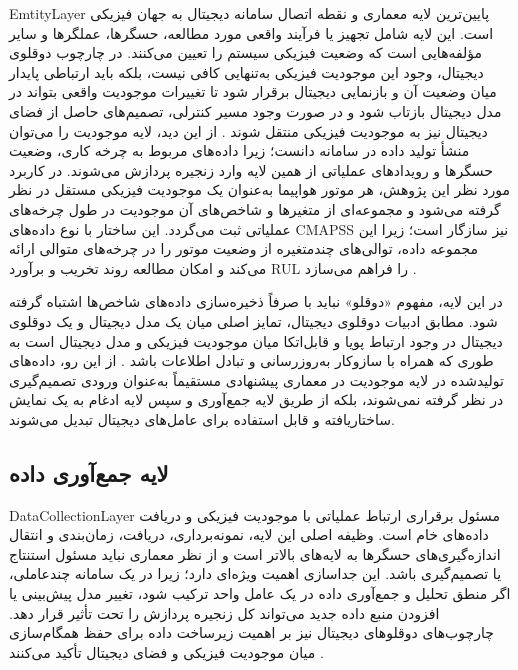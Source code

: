 \documentclass[a4paper,fleqn]{report}
\begin{document}
\gls{EmtityLayer} پایین‌ترین لایه معماری و نقطه اتصال سامانه دیجیتال به جهان فیزیکی است. این لایه شامل تجهیز یا فرآیند واقعی مورد مطالعه، حسگرها، عملگرها و سایر مؤلفه‌هایی است که وضعیت فیزیکی سیستم را تعیین می‌کنند. در چارچوب دوقلوی دیجیتال، وجود این موجودیت فیزیکی به‌تنهایی کافی نیست، بلکه باید ارتباطی پایدار میان وضعیت آن و بازنمایی دیجیتال برقرار شود تا تغییرات موجودیت واقعی بتواند در مدل دیجیتال بازتاب شود و در صورت وجود مسیر کنترلی، تصمیم‌های حاصل از فضای دیجیتال نیز به موجودیت فیزیکی منتقل شوند \cite{tao2019digital,barricelli2019survey,fuller2020digital}.
 از این دید، لایه موجودیت را می‌توان منشأ تولید داده در سامانه دانست؛ زیرا داده‌های مربوط به چرخه کاری، وضعیت حسگرها و رویدادهای عملیاتی از همین لایه وارد زنجیره پردازش می‌شوند. در کاربرد مورد نظر این پژوهش، هر موتور هواپیما به‌عنوان یک موجودیت فیزیکی مستقل در نظر گرفته می‌شود و مجموعه‌ای از متغیرها و شاخص‌های آن موجودیت در طول چرخه‌های عملیاتی ثبت می‌گردد. این ساختار با نوع داده‌های \gls{CMAPSS} نیز سازگار است؛ زیرا این مجموعه داده، توالی‌های چندمتغیره از وضعیت موتور را در چرخه‌های متوالی ارائه می‌کند و امکان مطالعه روند تخریب و برآورد \gls{RUL} را فراهم می‌سازد \cite{NASA2007C-MAPSS}.

در این لایه، مفهوم «دوقلو» نباید با صرفاً ذخیره‌سازی داده‌های شاخص‌ها اشتباه گرفته شود. مطابق ادبیات دوقلوی دیجیتال، تمایز اصلی میان یک مدل دیجیتال و یک دوقلوی دیجیتال در وجود ارتباط پویا و قابل‌اتکا میان موجودیت فیزیکی و مدل دیجیتال است به طوری که همراه با سازوکار به‌روزرسانی و تبادل اطلاعات باشد \cite{fuller2020digital,tao2019digital}. از این رو، داده‌های تولیدشده در لایه موجودیت در معماری پیشنهادی مستقیماً به‌عنوان ورودی تصمیم‌گیری در نظر گرفته نمی‌شوند، بلکه از طریق لایه جمع‌آوری و سپس لایه ادغام به یک نمایش ساختاریافته و قابل استفاده برای عامل‌های دیجیتال تبدیل می‌شوند.


\subsection{لایه جمع‌آوری داده}
\label{sec:layer-collection}

\gls{DataCollectionLayer} مسئول برقراری ارتباط عملیاتی با موجودیت فیزیکی و دریافت داده‌های خام است. وظیفه اصلی این لایه، نمونه‌برداری، دریافت، زمان‌بندی و انتقال اندازه‌گیری‌های حسگرها به لایه‌های بالاتر است و از نظر معماری نباید مسئول استنتاج یا تصمیم‌گیری باشد. این جداسازی اهمیت ویژه‌ای دارد؛ زیرا در یک سامانه چندعاملی، اگر منطق تحلیل و جمع‌آوری داده در یک عامل واحد ترکیب شود، تغییر مدل پیش‌بینی یا افزودن منبع داده جدید می‌تواند کل زنجیره پردازش را تحت تأثیر قرار دهد. چارچوب‌های  دوقلو‌های دیجیتال نیز بر اهمیت زیرساخت داده برای حفظ همگام‌سازی میان موجودیت فیزیکی و فضای دیجیتال تأکید می‌کنند \cite{qi2021enabling,fuller2020digital}.
\end{document}
